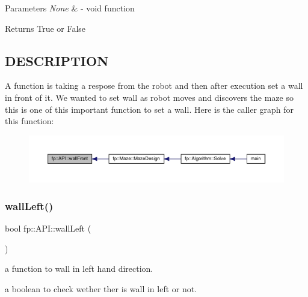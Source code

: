 \begin{DoxyParams}{Parameters}
{\em None} & -\/ void function \\
\hline
\end{DoxyParams}
\begin{DoxyReturn}{Returns}
True or False 
\end{DoxyReturn}
\hypertarget{_m_a_z_e_8h_DESCRIPTION}{}\subsection{D\+E\+S\+C\+R\+I\+P\+T\+I\+ON}\label{_m_a_z_e_8h_DESCRIPTION}
A function is taking a respose from the robot and then after execution set a wall in front of it. We wanted to set wall as robot moves and discovers the maze so this is one of this important function to set a wall. Here is the caller graph for this function\+:
\nopagebreak
\begin{figure}[H]
\begin{center}
\leavevmode
\includegraphics[width=350pt]{classfp_1_1_a_p_i_a52c23ca6b94cd561727e63c4a568bb86_icgraph}
\end{center}
\end{figure}
\mbox{\label{classfp_1_1_a_p_i_a49efec34a5521b6a7f202759f7f758d2}} 
\subsubsection{\texorpdfstring{wall\+Left()}{wallLeft()}}
{\footnotesize\ttfamily bool fp\+::\+A\+P\+I\+::wall\+Left (\begin{DoxyParamCaption}{ }\end{DoxyParamCaption})\hspace{0.3cm}{\ttfamily [static]}}



a function to wall in left hand direction. 

a boolean to check wether ther is wall in left or not.


